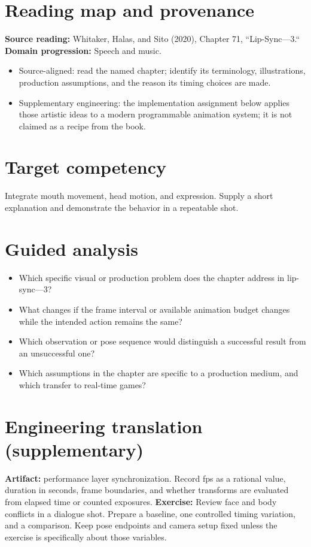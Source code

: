 \documentclass[10pt,letterpaper]{article}
\begin{document}
\makedoctitle
\makedocsummary

\section{Reading map and provenance}
\textbf{Source reading:} Whitaker, Halas, and Sito (2020), Chapter 71, ``Lip-Sync—3.``\\
\textbf{Domain progression:} Speech and music.
\begin{itemize}
\item Source-aligned: read the named chapter; identify its terminology, illustrations, production assumptions, and the reason its timing choices are made.
\item Supplementary engineering: the implementation assignment below applies those artistic ideas to a modern programmable animation system; it is not claimed as a recipe from the book.
\end{itemize}
\section{Target competency}
Integrate mouth movement, head motion, and expression. Supply a short explanation and demonstrate the behavior in a repeatable shot.
\section{Guided analysis}
\begin{itemize}
\item Which specific visual or production problem does the chapter address in lip-sync—3?
\item What changes if the frame interval or available animation budget changes while the intended action remains the same?
\item Which observation or pose sequence would distinguish a successful result from an unsuccessful one?
\item Which assumptions in the chapter are specific to a production medium, and which transfer to real-time games?
\end{itemize}
\section{Engineering translation (supplementary)}
\textbf{Artifact:} performance layer synchronization. Record fps as a rational value, duration in seconds, frame boundaries, and whether transforms are evaluated from elapsed time or counted exposures.
\textbf{Exercise:} Review face and body conflicts in a dialogue shot. Prepare a baseline, one controlled timing variation, and a comparison. Keep pose endpoints and camera setup fixed unless the exercise is specifically about those variables.
\end{document}

